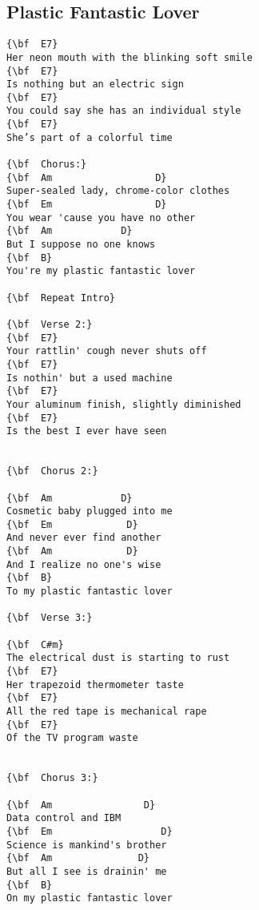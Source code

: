 \documentclass[a4paper]{article}
\begin{document}
\subsection{Plastic Fantastic Lover}
\begin{multicols}{2}\begin{Verbatim}[commandchars=\\\{\}]
{\bf  E7}
Her neon mouth with the blinking soft smile
{\bf  E7}
Is nothing but an electric sign
{\bf  E7}
You could say she has an individual style
{\bf  E7}
She’s part of a colorful time

{\bf  Chorus:}
{\bf  Am                  D}
Super-sealed lady, chrome-color clothes
{\bf  Em                  D}
You wear 'cause you have no other
{\bf  Am            D}
But I suppose no one knows
{\bf  B}
You're my plastic fantastic lover

{\bf  Repeat Intro}

{\bf  Verse 2:}
{\bf  E7}
Your rattlin' cough never shuts off
{\bf  E7}
Is nothin' but a used machine
{\bf  E7}
Your aluminum finish, slightly diminished
{\bf  E7}
Is the best I ever have seen


{\bf  Chorus 2:}

{\bf  Am            D}
Cosmetic baby plugged into me
{\bf  Em             D}
And never ever find another
{\bf  Am             D}
And I realize no one's wise
{\bf  B}
To my plastic fantastic lover

{\bf  Verse 3:}

{\bf  C#m}
The electrical dust is starting to rust
{\bf  E7}
Her trapezoid thermometer taste
{\bf  E7}
All the red tape is mechanical rape
{\bf  E7}
Of the TV program waste


{\bf  Chorus 3:}

{\bf  Am                D}
Data control and IBM
{\bf  Em                   D}
Science is mankind's brother
{\bf  Am               D}
But all I see is drainin' me
{\bf  B}
On my plastic fantastic lover

\end{Verbatim}
\end{multicols}\newpage
\end{document}
